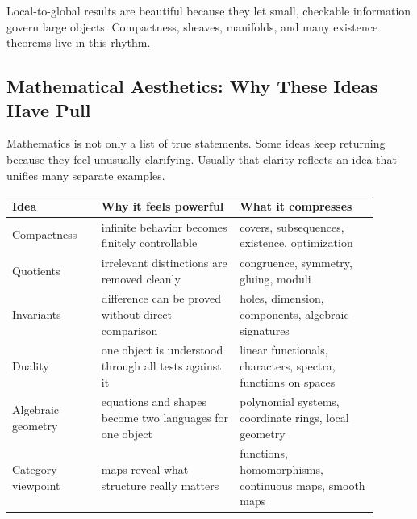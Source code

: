 \begin{center}
\end{center}

\begin{aestheticbox}
Local-to-global results are beautiful because they let small, checkable
information govern large objects. Compactness, sheaves, manifolds, and many
existence theorems live in this rhythm.
\end{aestheticbox}

\subsection{Mathematical Aesthetics: Why These Ideas Have Pull}

Mathematics is not only a list of true statements. Some ideas keep returning
because they feel unusually clarifying. Usually that clarity reflects
an idea that unifies many separate examples.

\begin{longtable}{p{0.22\linewidth}p{0.34\linewidth}p{0.34\linewidth}}
\toprule
Idea & Why it feels powerful & What it compresses \\
\midrule
Compactness & infinite behavior becomes finitely controllable & covers, subsequences, existence, optimization \\
Quotients & irrelevant distinctions are removed cleanly & congruence, symmetry, gluing, moduli \\
Invariants & difference can be proved without direct comparison & holes, dimension, components, algebraic signatures \\
Duality & one object is understood through all tests against it & linear functionals, characters, spectra, functions on spaces \\
Algebraic geometry & equations and shapes become two languages for one object & polynomial systems, coordinate rings, local geometry \\
Category viewpoint & maps reveal what structure really matters & functions, homomorphisms, continuous maps, smooth maps \\
\bottomrule
\end{longtable}

